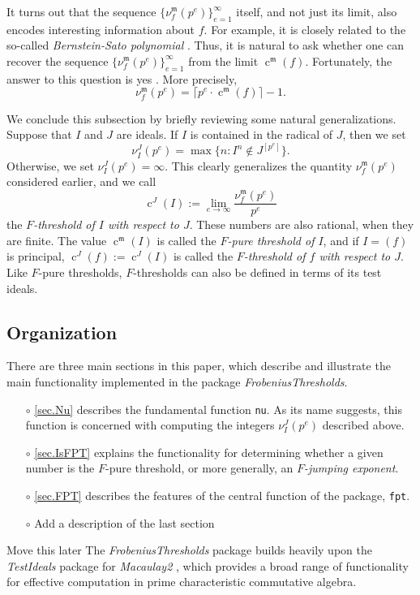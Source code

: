 \documentclass{amsart}
\newcommand{\ft}{\operatorname{c}}
\newcommand{\idealm}{\mathfrak{m}}
\begin{document}
It turns out that the sequence $\{ \nu_f^{\idealm}(p^e) \}_{e=1}^{\infty}$ itself, and not just its limit, also encodes interesting information about $f$.  For example, it is closely related to the so-called \emph{Bernstein-Sato polynomial} \cite{MustataTakagiWatanabeFThresholdsAndBernsteinSato}.  Thus, it is natural to ask whether one can recover the sequence $\{ \nu_f^{\idealm}(p^e) \}_{e=1}^{\infty}$ from the limit $\ft^{\idealm}(f)$.  Fortunately, the answer to this question is yes \cite{MustataTakagiWatanabeFThresholdsAndBernsteinSato, HernandezFPurityOfHypersurfaces}. More precisely,
\begin{equation*}
\nu_f^{\idealm}(p^e) = \lceil p^e \cdot \ft^{\idealm}(f) \rceil - 1.
\end{equation*}

We conclude this subsection by briefly reviewing some natural generalizations.  Suppose that $I$ and $J$ are ideals.  If $I$ is contained in the radical of $J$, then we set
%
\[ \nu_I^J(p^e) = \max \{ n : I^n \notin J^{[p^e]} \}. \]
Otherwise, we set $\nu_I^J(p^e) = \infty$.
This clearly generalizes the quantity $\nu_f^{\idealm}(p^e)$ considered earlier, and we call
\[ \ft^J(I) := \lim_{e \to \infty} \frac{ \nu_f^{\idealm}(p^e)}{p^e} \]
the \emph{$F$-threshold of $I$ with respect to $J$}.  These numbers are also rational, when they are finite.
The value $\ft^{\idealm}(I)$ is called the \emph{$F$-pure threshold of $I$}, and if $I = (f)$ is principal,  $\ft^{J}(f) := \ft^J(I)$ is called the \emph{$F$-threshold of $f$ with respect to $J$}.
Like $F$-pure thresholds, $F$-thresholds can also be defined in terms of its test ideals.


\subsection*{Organization}

There are three main sections in this paper, which describe and illustrate the main functionality implemented in the package \emph{FrobeniusThresholds}.
\begin{itemize}
\item[$\circ$] \autoref{sec.Nu} describes the fundamental function {\tt nu}.  As its name suggests, this function is concerned with computing the integers $\nu_I^J(p^e)$ described above.
\item[$\circ$] \autoref{sec.IsFPT} explains the functionality for determining whether a given number is the $F$-pure threshold, or more generally, an \emph{$F$-jumping exponent}.
\item[$\circ$] \autoref{sec.FPT} describes the features of the central function of the package, {\tt fpt}.
\item[$\circ$]  {\color{red} Add a description of the last section}
\end{itemize}
{\color{red} Move this later}
The \emph{FrobeniusThresholds} package builds heavily upon the \emph{TestIdeals} package for \emph{Macaulay2} \cite{TestIdealsPackage, TestIdealsPaper}, which provides a broad range of functionality for effective computation in prime characteristic commutative algebra.
\end{document}
